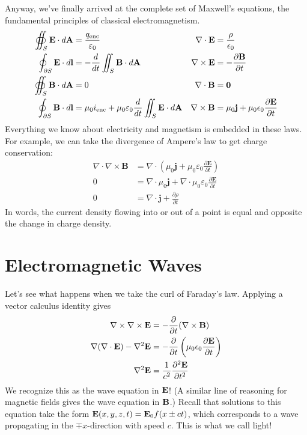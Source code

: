 \documentclass[../p051main.tex]{subfiles}
\begin{document}
Anyway, we've finally arrived at the complete set of Maxwell's equations, the fundamental principles of classical electromagnetism.
\begin{align*}
    \oiint_S \mathbf{E} \cdot d\mathbf{A} &= \frac{q_\textrm{enc}}{\varepsilon_0} & \nabla \cdot \mathbf{E} &= \frac{\rho}{\epsilon_0} \\
    \oint_{\partial S} \mathbf{E} \cdot d\mathbf{l} &= -\frac{d}{dt} \iint_S \mathbf{B} \cdot d\mathbf{A} & \nabla \times \mathbf{E} &= -\frac{\partial \mathbf{B}}{\partial t} \\
    \oiint_S \mathbf{B} \cdot d\mathbf{A} &= 0 & \nabla \cdot \mathbf{B} &= \mathbf{0} \\
    \oint_{\partial S} \mathbf{B} \cdot d\mathbf{l} &= \mu_0 i_\textrm{enc} + \mu_0 \varepsilon_0 \frac{d}{dt}\iint_S \mathbf{E} \cdot d\mathbf{A} & \nabla \times \mathbf{B} &= \mu_0 \mathbf{j} + \mu_0 \epsilon_0 \frac{\partial \mathbf{E}}{\partial t}
\end{align*}
Everything we know about electricity and magnetism is embedded in these laws.
For example, we can take the divergence of Ampere's law to get charge conservation:
\begin{align*}
    \nabla \cdot \nabla \times \mathbf{B} &= \nabla \cdot \left( \mu_0 \mathbf{j} + \mu_0 \varepsilon_0 \frac{\partial \mathbf{E}}{\partial t} \right) \\
    0 &= \nabla \cdot \mu_0 \mathbf{j} +  \nabla \cdot \mu_0 \varepsilon_0 \frac{\partial \mathbf{E}}{\partial t} \\
    0 &= \nabla \cdot \mathbf{j} + \frac{\partial \rho}{\partial t}
\end{align*}
In words, the current density flowing into or out of a point is equal and opposite the change in charge density.

\section{Electromagnetic Waves}
Let's see what happens when we take the curl of Faraday's law.
Applying a vector calculus identity gives
\begin{align*}
    \nabla \times \nabla \times \mathbf{E} &= -\frac{\partial}{\partial t} (\nabla \times \mathbf{B}) \\
    \nabla (\nabla \cdot \mathbf{E}) - \nabla^2 \mathbf{E} &= -\frac{\partial}{\partial t} \left( \mu_0 \epsilon_0 \frac{\partial \mathbf{E}}{\partial t} \right) \\
    \nabla^2 \mathbf{E} &= \frac{1}{c^2} \frac{\partial^2 \mathbf{E}}{\partial t^2}
\end{align*}
We recognize this as the wave equation in $\mathbf{E}$!
(A similar line of reasoning for magnetic fields gives the wave equation in $\mathbf{B}$.)
Recall that solutions to this equation take the form $\mathbf{E}(x,y,z,t) = \mathbf{E}_0 f(x \pm ct)$, which corresponds to a wave propagating in the $\mp x$-direction with speed $c$.
This is what we call light!
\end{document}
